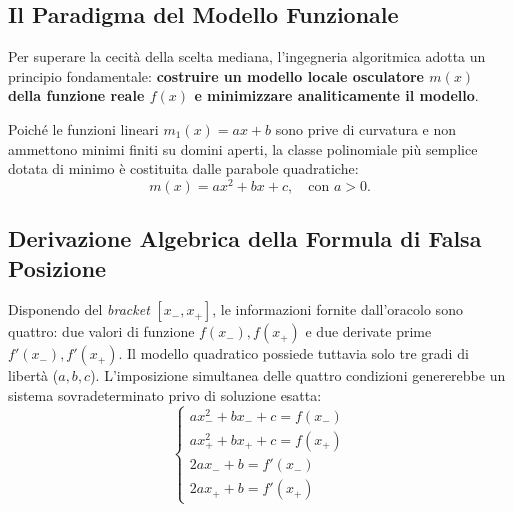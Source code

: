 \subsection{Il Paradigma del Modello Funzionale}
Per superare la cecit\`a della scelta mediana, l'ingegneria algoritmica adotta un principio fondamentale: \textbf{costruire un modello locale osculatore $m(x)$ della funzione reale $f(x)$ e minimizzare analiticamente il modello}.

Poich\'e le funzioni lineari $m_1(x) = ax + b$ sono prive di curvatura e non ammettono minimi finiti su domini aperti, la classe polinomiale pi\`u semplice dotata di minimo \`e costituita dalle parabole quadratiche:
\begin{equation}
    m(x) = a x^2 + b x + c, \quad \text{con } a > 0.
    \label{eq:quadratic-model-parabola}
\end{equation}

\subsection{Derivazione Algebrica della Formula di Falsa Posizione}
Disponendo del \textit{bracket} $[x_-, x_+]$, le informazioni fornite dall'oracolo sono quattro: due valori di funzione $f(x_-), f(x_+)$ e due derivate prime $f'(x_-), f'(x_+)$.
Il modello quadratico possiede tuttavia solo tre gradi di libert\`a ($a, b, c$). L'imposizione simultanea delle quattro condizioni genererebbe un sistema sovradeterminato privo di soluzione esatta:
\begin{equation}
    \begin{cases}
        a x_-^2 + b x_- + c = f(x_-) \\
        a x_+^2 + b x_+ + c = f(x_+) \\
        2 a x_- + b = f'(x_-) \\
        2 a x_+ + b = f'(x_+)
    \end{cases}
\end{equation}

